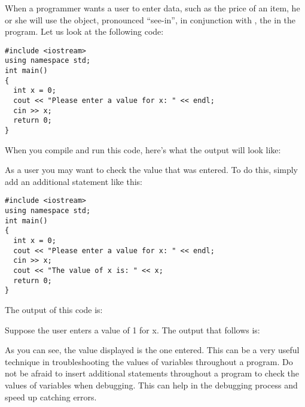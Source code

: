 
When a programmer wants a user to enter data, such as the price of an item, he or she will use the  object, pronounced ``see-in'', in conjunction with \Code{>>}, the  in the program. 
Let us look at the following code:

\noindent\begin{minipage}{\linewidth}\begin{lstlisting}
#include <iostream>
using namespace std;
int main()
{
  int x = 0;   				      
  cout << "Please enter a value for x: " << endl; 
  cin >> x;
  return 0;
}
\end{lstlisting}\end{minipage}

When you compile and run this code, here's what the output will look like:

\noindent {}

As a user you may want to check the value that was entered. 
To do this, simply add an additional  statement like this: \nopagebreak[4]

\noindent\begin{minipage}{\linewidth}\begin{lstlisting}
#include <iostream>
using namespace std;
int main()
{
  int x = 0;   				      
  cout << "Please enter a value for x: " << endl; 
  cin >> x;
  cout << "The value of x is: " << x;
  return 0;
}
\end{lstlisting}\end{minipage}

\noindent The output of this code is:

\noindent {}

\noindent Suppose the user enters a value of 1 for x. The output that follows is:

\noindent {}

As you can see, the value displayed is the one entered. 
This can be a very useful technique in troubleshooting the values of variables throughout a program. 
Do not be afraid to insert additional  statements throughout a program to check the values of variables when debugging. 
This can help in the debugging process and speed up catching errors. 

